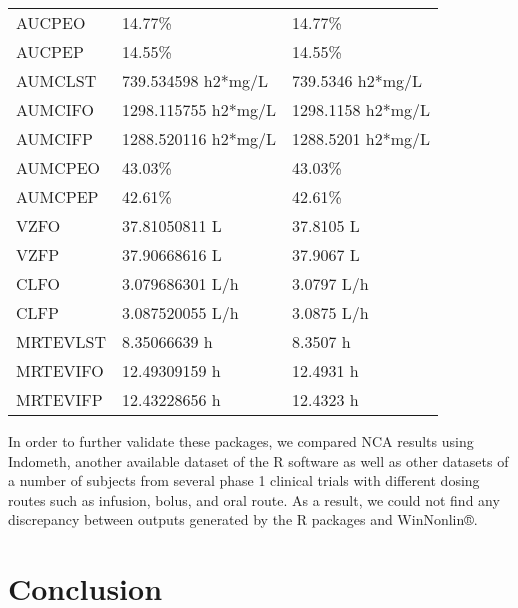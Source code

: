 \documentclass[12pt,]{krantz}
\theoremstyle{definition}
\theoremstyle{definition}
\theoremstyle{definition}
\theoremstyle{remark}
\begin{document}
\begin{table}
\begin{tabular}[t]{lll}
\addlinespace
AUCPEO & 14.77\% & 14.77\%\\
AUCPEP & 14.55\% & 14.55\%\\
AUMCLST & 739.534598 h2*mg/L & 739.5346 h2*mg/L\\
AUMCIFO & 1298.115755 h2*mg/L & 1298.1158 h2*mg/L\\
AUMCIFP & 1288.520116 h2*mg/L & 1288.5201 h2*mg/L\\
\addlinespace
AUMCPEO & 43.03\% & 43.03\%\\
AUMCPEP & 42.61\% & 42.61\%\\
VZFO & 37.81050811 L & 37.8105 L\\
VZFP & 37.90668616 L & 37.9067 L\\
CLFO & 3.079686301 L/h & 3.0797 L/h\\
\addlinespace
CLFP & 3.087520055 L/h & 3.0875 L/h\\
MRTEVLST & 8.35066639 h & 8.3507 h\\
MRTEVIFO & 12.49309159 h & 12.4931 h\\
MRTEVIFP & 12.43228656 h & 12.4323 h\\
\bottomrule
\end{tabular}
\end{table}

In order to further validate these packages, we compared NCA results
using Indometh, another available dataset of the R software as well as
other datasets of a number of subjects from several phase 1 clinical
trials with different dosing routes such as infusion, bolus, and oral
route. As a result, we could not find any discrepancy between outputs
generated by the R packages and WinNonlin®.

\chapter{Conclusion}\label{conclusion}
\end{document}
